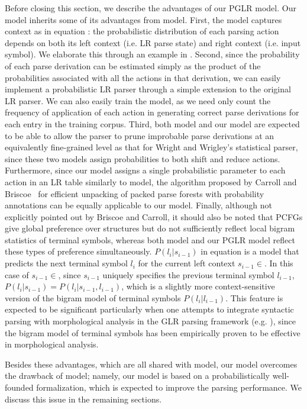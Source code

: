 \documentclass[a4j]{article}
\def\BC{}
\def\Ss{}
\def\sec#1{}
\def\eq#1{}
\begin{document}
Before closing this section, we describe the advantages of our PGLR
model. Our model inherits some of its advantages from \BC model. First,
the model captures context as in equation \eq{a1}: the probabilistic
distribution of each parsing action depends on both its left context
(i.e. LR parse state) and right context (i.e. input symbol). We
elaborate this through an example in \sec{example}.  Second, since the
probability of each parse derivation can be estimated simply as the
product of the probabilities associated with all the actions in that
derivation, we can easily implement a probabilistic LR parser through a
simple extension to the original LR parser. We can also easily train the
model, as we need only count the frequency of application of each action
in generating correct parse derivations for each entry in the training
corpus.  Third, both \BC model and our model are expected to be able to
allow the parser to prune improbable parse derivations at an
equivalently fine-grained level as that for Wright and Wrigley's
statistical parser, since these two models assign probabilities to both
shift and reduce actions. Furthermore, since our model assigns a single
probabilistic parameter to each action in an LR table similarly to \BC
model, the algorithm proposed by Carroll and Briscoe~\cite{carroll:92:a}
for efficient unpacking of packed parse forests with probability
annotations can be equally applicable to our model. Finally, although
not explicitly pointed out by Briscoe and Carroll, it should also be
noted that PCFGs give global preference over structures but do not
sufficiently reflect local bigram statistics of terminal symbols,
whereas both \BC model and our PGLR model reflect these types of
preference simultaneously. $P(l_i|s_{i-1})$ in equation \eq{l1} is a
model that predicts the next terminal symbol $l_i$ for the current left
context $s_{i-1}\in\Ss$. In this case of $s_{i-1}\in\Ss$, since
$s_{i-1}$ uniquely specifies the previous terminal symbol $l_{i-1}$,
$P(l_i|s_{i-1})=P(l_i|s_{i-1},l_{i-1})$, which is a slightly more
context-sensitive version of the bigram model of terminal symbols
$P(l_i|l_{i-1})$. This feature is expected to be significant
particularly when one attempts to integrate syntactic parsing with
morphological analysis in the GLR parsing framework
(e.g. \cite{li:95:a}), since the bigram model of terminal symbols has
been empirically proven to be effective in morphological analysis.

Besides these advantages, which are all shared with \BC model, our model
overcomes the drawback of \BC model; namely, our model is based on a
probabilistically well-founded formalization, which is expected to
improve the parsing performance. We discuss this issue in the remaining
sections.
\end{document}
